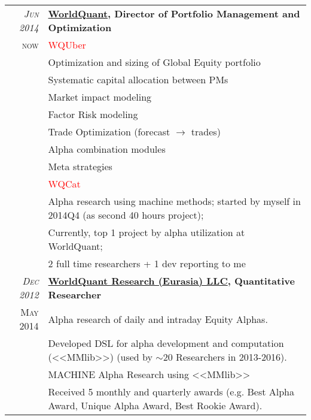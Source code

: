 \documentclass[unicode,a4paper,10pt]{article}
\begin{document}
\begin{tabular}{r p{13cm}}

 \emph{\textsc{Jun 2014}} & \textbf{\href{https://www.worldquant.com/}{WorldQuant}, Director of Portfolio Management and Optimization} \\
\textsc{now}
&\footnotesize{\textcolor{red}{WQUber}} \\
&\footnotesize{\hspace{0.5cm} Optimization and sizing of Global Equity portfolio}\\
&\footnotesize{\hspace{0.5cm} Systematic capital allocation between PMs}\\
&\footnotesize{\hspace{0.5cm} Market impact modeling}\\
&\footnotesize{\hspace{0.5cm} Factor Risk modeling}\\
&\footnotesize{\hspace{0.5cm} Trade Optimization (forecast $\to$ trades)}\\
&\footnotesize{\hspace{0.5cm} Alpha combination modules}\\
&\footnotesize{\hspace{0.5cm} Meta strategies}\\
&\footnotesize{\textcolor{red}{WQCat}} \\
&\footnotesize{\hspace{0.5cm} Alpha research using machine methods; started by myself in 2014Q4 (as second 40 hours project);} \\
&\footnotesize{\hspace{0.5cm} Currently, top 1 project by alpha utilization at WorldQuant;}\\
&\footnotesize{\hspace{0.5cm} 2 full time researchers + 1 dev reporting to me}\\


 \emph{\textsc{Dec 2012}} & \textbf{\href{https://www.worldquant.com/}{WorldQuant Research (Eurasia) LLC}, Quantitative Researcher} \\
\textsc{May 2014}
&\footnotesize{Alpha research of daily and intraday Equity Alphas.}\\
&\footnotesize{Developed DSL for alpha development and computation (<<MMlib>>) (used by $\sim$20 Researchers in 2013-2016).}\\
&\footnotesize{MACHINE Alpha Research using <<MMlib>>}\\
&\footnotesize{Received 5 monthly and quarterly awards (e.g. Best Alpha Award, Unique Alpha Award, Best Rookie Award).}\\



\end{tabular}
\end{document}
